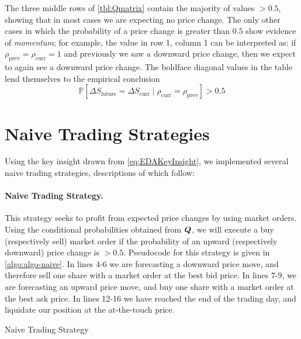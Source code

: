 The three middle rows of \autoref{tbl:Qmatrix} contain the majority of values $>0.5$, showing that in most cases we are expecting no price change. The only other cases in which the probability of a price change is greater than $0.5$ show evidence of \textit{momentum}; for example, the value in row 1, column 1 can be interpreted as: if $\rho_\text{prev} = \rho_\text{curr} = 1$ and previously we saw a downward price change, then we expect to again see a downward price change. The boldface diagonal values in the table lend themselves to the empirical conclusion
\begin{equation}\label{eq:EDAKeyInsight}
\mathbb{P} \left[ \Delta S_\text{future} = \Delta S_\text{curr} \; | \; \rho_\text{curr} = \rho_\text{prev} \right] > 0.5
\end{equation}

\section{Naive Trading Strategies}
Using the key insight drawn from \eqref{eq:EDAKeyInsight}, we implemented several naive trading strategies, descriptions of which follow:

\paragraph{Naive Trading Strategy.}  This strategy seeks to profit from expected price changes by using market orders. Using the conditional probabilities obtained from $\boldsymbol{Q}$, we will execute a buy (respectively sell) market order if the probability of an upward (respectively downward) price change is $> 0.5$. Pseudocode for this strategy is given in \autoref{algo:algo-naive}. In lines 4-6 we are forecasting a downward price move, and therefore sell one share with a market order at the best bid price. In lines 7-9, we are forecasting an upward price move, and buy one share with a market order at the best ask price. In lines 12-16 we have reached the end of the trading day, and liquidate our position at the at-the-touch price.
\begin{algorithm}[htb]
	\caption{Naive Trading Strategy}
	
	\label{algo:algo-naive}
\end{algorithm}

\clearpage
